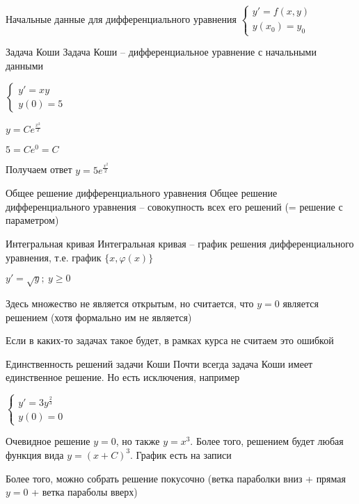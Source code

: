 \documentclass[12pt]{article}
\begin{document}
\begin{nota}{Начальные данные для дифференциального уравнения}
    $\begin{cases}
        y' = f(x, y) \\
        y(x_0) = y_0
    \end{cases}$
\end{nota}

\begin{defin}{Задача Коши}
    Задача Коши -- дифференциальное уравнение с начальными данными
\end{defin}

\begin{Example}{}
    $\begin{cases}
        y' = xy \\
        y(0) = 5
    \end{cases}$

    $y = Ce^{\frac{x^2}{2}}$

    $5 = Ce^0 = C$

    Получаем ответ $y = 5e^{\frac{x^2}{2}}$
\end{Example}

\begin{defin}{Общее решение дифференциального уравнения}
    Общее решение дифференциального уравнения -- совокупность всех его решений (= решение с параметром)
\end{defin}

\begin{defin}{Интегральная кривая}
    Интегральная кривая -- график решения дифференциального уравнения, т.е. график $\{x, \varphi(x)\}$
\end{defin}

\begin{Remark}{}
    $y' = \sqrt{y};\ y \geq 0$

    Здесь множество не является открытым, но считается, что $y = 0$ является решением (хотя формально им не является)

    Если в каких-то задачах такое будет, в рамках курса не считаем это ошибкой
\end{Remark}

\begin{Remark}{Единственность решений задачи Коши}
    Почти всегда задача Коши имеет единственное решение. Но есть исключения, например

    $\begin{cases}
        y' = 3y^{\frac{2}{3}} \\
        y(0) = 0
    \end{cases}$

    Очевидное решение $y = 0$, но также $y = x^3$. Более того, решением будет любая функция вида $y = (x + C)^3$. График есть на записи

    Более того, можно собрать решение покусочно (ветка параболки вниз + прямая $y = 0$ + ветка параболы вверх)
\end{Remark}
\end{document}
